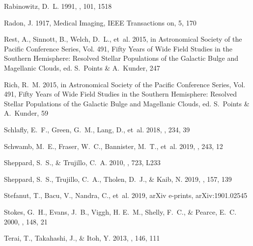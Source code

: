 \documentclass[twocolumn]{aastex62}
\begin{document}
\begin{thebibliography}{}
{Rabinowitz}, D.~L. 1991, \aj, 101, 1518

Radon, J. 1917, Medical Imaging, IEEE Transactions on, 5, 170

{Rest}, A., {Sinnott}, B., {Welch}, D.~L., {et~al.} 2015, in Astronomical
  Society of the Pacific Conference Series, Vol. 491, Fifty Years of Wide Field
  Studies in the Southern Hemisphere: Resolved Stellar Populations of the
  Galactic Bulge and Magellanic Clouds, ed. S.~{Points} \& A.~{Kunder}, 247

{Rich}, R.~M. 2015, in Astronomical Society of the Pacific Conference Series,
  Vol. 491, Fifty Years of Wide Field Studies in the Southern Hemisphere:
  Resolved Stellar Populations of the Galactic Bulge and Magellanic Clouds, ed.
  S.~{Points} \& A.~{Kunder}, 59

{Schlafly}, E.~F., {Green}, G.~M., {Lang}, D., {et~al.} 2018, \apjs, 234, 39

{Schwamb}, M.~E., {Fraser}, W.~C., {Bannister}, M.~T., {et~al.} 2019, \apjs,
  243, 12

{Sheppard}, S.~S., \& {Trujillo}, C.~A. 2010, \apjl, 723, L233

{Sheppard}, S.~S., {Trujillo}, C.~A., {Tholen}, D.~J., \& {Kaib}, N. 2019, \aj,
  157, 139

{Stefanut}, T., {Bacu}, V., {Nandra}, C., {et~al.} 2019, arXiv e-prints,
  arXiv:1901.02545

{Stokes}, G.~H., {Evans}, J.~B., {Viggh}, H. E.~M., {Shelly}, F.~C., \&
  {Pearce}, E.~C. 2000, \icarus, 148, 21

{Terai}, T., {Takahashi}, J., \& {Itoh}, Y. 2013, \aj, 146, 111


\end{thebibliography}
\end{document}
